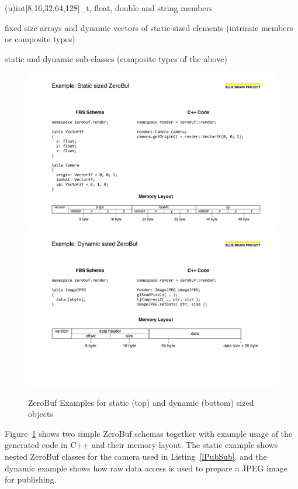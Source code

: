 \documentclass[10pt]{llncs}
\newcommand{\lref}[1]{Listing~\ref{#1}}
\newcommand{\fig}[1]{Figure~\ref{#1}}
\begin{document}
\begin{compactitem}
\item (u)int[8,16,32,64,128]\_t, float, double and string members
\item fixed size arrays and dynamic vectors of static-sized elements (intrinsic
members or composite types)
\item static and dynamic sub-classes (composite types of the above)
\end{compactitem}

\begin{figure}[ht]\center
  \includegraphics[width=\columnwidth]{images/ZeroBufStatic}\\\vspace{4ex}
  \includegraphics[width=\columnwidth]{images/ZeroBufDynamic}
  \caption{\label{fZeroBuf}ZeroBuf Examples for static (top) and dynamic
(bottom) sized objects}
\end{figure}

\fig{fZeroBuf} shows two simple ZeroBuf schemas together with example usage of
the generated code in C++ and their memory layout. The static example shows
nested ZeroBuf classes for the camera used in \lref{lPubSub}, and the dynamic
example shows how raw data access is used to prepare a JPEG image for
publishing.
\end{document}
